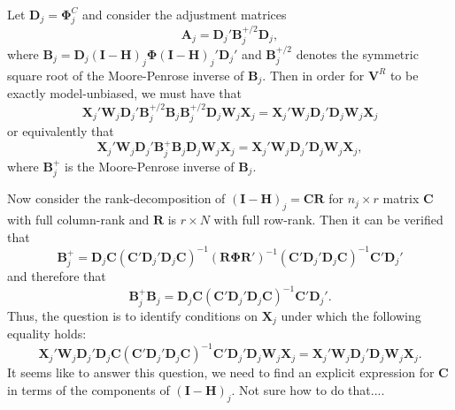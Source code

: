 \documentclass{article}\usepackage[]{graphicx}\usepackage[]{color}
\newcommand{\bm}{\mathbf}
\newcommand{\bs}{\boldsymbol}
\begin{document}
\def\spacingset#1{\renewcommand{\baselinestretch}%
{#1}\small\normalsize} \spacingset{1}

Let $\bm{D}_j = \bs\Phi_j^C$ and consider the adjustment matrices 
\[
\bm{A}_j = \bm{D}_j' \bm{B}_j^{+/2} \bm{D}_j, \]
where $\bm{B}_j = \bm{D}_j \left(\bm{I} - \bm{H}\right)_j \bs\Phi \left(\bm{I} - \bm{H}\right)_j' \bm{D}_j'$ and $\bm{B}_j^{+/2}$ denotes the symmetric square root of the Moore-Penrose inverse of $\bm{B}_j$. Then in order for $\bm{V}^R$ to be exactly model-unbiased, we must have that 
\[
\bm{X}_j' \bm{W}_j \bm{D}_j' \bm{B}_j^{+/2} \bm{B}_j \bm{B}_j^{+/2} \bm{D}_j \bm{W}_j \bm{X}_j = \bm{X}_j' \bm{W}_j \bm{D}_j' \bm{D}_j \bm{W}_j \bm{X}_j \]
or equivalently that 
\[
\bm{X}_j' \bm{W}_j \bm{D}_j' \bm{B}_j^+ \bm{B}_j \bm{D}_j \bm{W}_j \bm{X}_j = \bm{X}_j' \bm{W}_j \bm{D}_j' \bm{D}_j \bm{W}_j \bm{X}_j, \]
where $\bm{B}_j^+$ is the Moore-Penrose inverse of $\bm{B}_j$. 

Now consider the rank-decomposition of $\left(\bm{I} - \bm{H}\right)_j = \bm{C}\bm{R}$ for $n_j \times r$ matrix $\bm{C}$ with full column-rank and $\bm{R}$ is $r \times N$ with full row-rank. Then it can be verified that \[
\bm{B}_j^+ = \bm{D}_j \bm{C}\left(\bm{C}'\bm{D}_j'\bm{D}_j \bm{C}\right)^{-1} \left(\bm{R}\bs\Phi\bm{R}'\right)^{-1} \left(\bm{C}'\bm{D}_j'\bm{D}_j \bm{C}\right)^{-1} \bm{C}' \bm{D}_j'
\]
and therefore that \[
\bm{B}_j^+ \bm{B}_j = \bm{D}_j \bm{C}\left(\bm{C}'\bm{D}_j'\bm{D}_j \bm{C}\right)^{-1} \bm{C}' \bm{D}_j'.
\]
Thus, the question is to identify conditions on $\bm{X}_j$ under which the following equality holds: \[
\bm{X}_j' \bm{W}_j \bm{D}_j' \bm{D}_j \bm{C}\left(\bm{C}'\bm{D}_j'\bm{D}_j \bm{C}\right)^{-1} \bm{C}' \bm{D}_j' \bm{D}_j \bm{W}_j \bm{X}_j = \bm{X}_j' \bm{W}_j \bm{D}_j' \bm{D}_j \bm{W}_j \bm{X}_j. \]
It seems like to answer this question, we need to find an explicit expression for $\bm{C}$ in terms of the components of $\left(\bm{I} - \bm{H}\right)_j$. Not sure how to do that....
\end{document}
